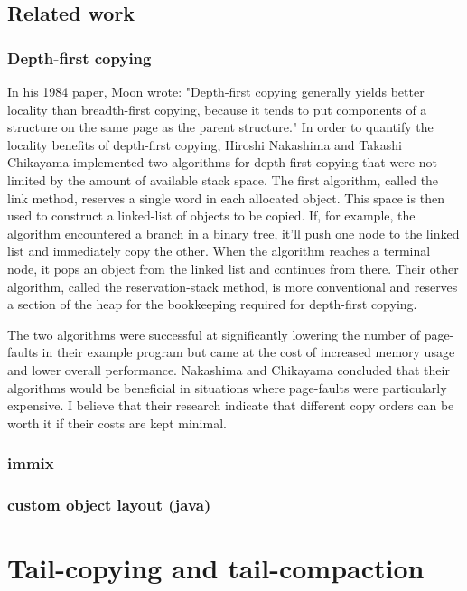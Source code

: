 \documentclass[a4paper,oneside]{memoir}
\begin{document}
\section{Related work}
\subsection{Depth-first copying}

In his 1984 paper, Moon wrote: "Depth-first copying generally yields better locality than
breadth-first copying, because it tends to put components of a structure on the
same page as the parent structure."
\cite{Moon:1984}
In order to quantify the locality benefits of depth-first copying,
Hiroshi Nakashima and Takashi Chikayama implemented two algorithms for depth-first
copying that were not limited by the amount of available stack space.\cite{Nakashima}
The first
algorithm, called the link method, reserves a single word in each allocated
object. This space is then used to construct a linked-list of objects to be copied.
If, for example, the algorithm encountered a branch in a binary tree, it'll push
one node to the linked list and immediately copy the other. When the algorithm
reaches a terminal node, it pops an object from the linked list and continues
from there.
Their other algorithm, called the reservation-stack method, is more conventional
and reserves a section of the heap for the bookkeeping required for depth-first
copying.

The two algorithms were successful at significantly lowering the number of
page-faults in their example program but came at the cost of increased memory
usage and lower overall performance. Nakashima and Chikayama concluded that
their algorithms would be beneficial in situations where page-faults were
particularly expensive. I believe that their research indicate that different
copy orders can be worth it if their costs are kept minimal.

\subsection{immix}
\subsection{custom object layout (java)}

\chapter{Tail-copying and tail-compaction}
\end{document}
